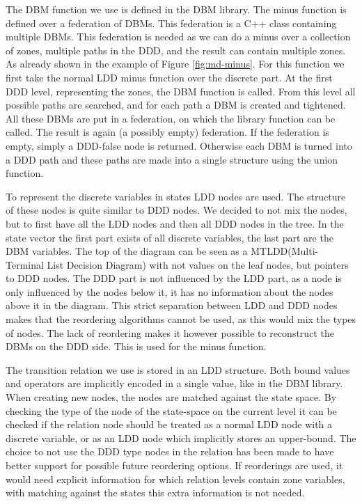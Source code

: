The DBM function we use is defined in the \uppaal{} DBM library. The minus function is defined over a federation of DBMs. This federation is a C++ class containing multiple DBMs. This federation is needed as we can do a minus over a collection of zones, multiple paths in the DDD, and the result can contain multiple zones. As already shown in the example of Figure \ref{fig:md-minus}. For this function we first take the normal LDD minus function over the discrete part. At the first DDD level, representing the zones, the DBM function is called. From this level all possible paths are searched, and for each path a DBM is created and tightened. All these DBMs are put in a federation, on which the library function can be called. The result is again (a possibly empty) federation. If the federation is empty, simply a DDD-false node is returned. Otherwise each DBM is turned into a DDD path and these paths are made into a single structure using the union function.

To represent the discrete variables in states LDD nodes are used. The structure of these nodes is quite similar to DDD nodes. We decided to not mix the nodes, but to first have all the LDD nodes and then all DDD nodes in the tree. In the state vector the first part exists of all discrete variables, the last part are the DBM variables. The top of the diagram can be seen as a MTLDD(Multi-Terminal List Decision Diagram) with not values on the leaf nodes, but pointers to DDD nodes. The DDD part is not influenced by the LDD part, as a node is only influenced by the nodes below it, it has no information about the nodes above it in the diagram. This strict separation between LDD and DDD nodes makes that the reordering algorithms cannot be used, as this would mix the types of nodes. The lack of reordering makes it however possible to reconstruct the DBMs on the DDD side. This is used for the minus function.

The transition relation we use is stored in an LDD structure. Both bound values and operators are implicitly encoded in a single value, like in the DBM library. When creating new nodes, the nodes are matched against the state space. By checking the type of the node of the state-space on the current level it can be checked if the relation node should be treated as a normal LDD node with a discrete variable, or as an LDD node which implicitly stores an upper-bound. The choice to not use the DDD type nodes in the relation has been made to have better support for possible future reordering options. If reorderings are used, it would need explicit information for which relation levels contain zone variables, with matching against the states this extra information is not needed.

